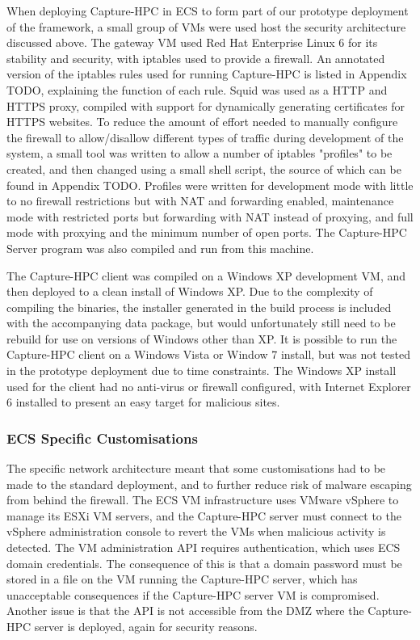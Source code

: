 When deploying Capture-HPC in ECS to form part of our prototype deployment of
the framework, a small group of VMs were used host the security architecture
discussed above. The gateway VM used Red Hat Enterprise Linux 6 for its
stability and security,
with iptables used to provide a firewall. An annotated version of the iptables
rules used for running Capture-HPC is listed in Appendix TODO, explaining the
function of each rule. Squid was used as a HTTP and HTTPS proxy, compiled with
support for dynamically generating certificates for HTTPS websites. To reduce
the amount of effort needed to manually configure the firewall to allow/disallow
different types of traffic during
development of the system, a small tool was written to allow a number of
iptables "profiles" to be created, and then changed using a small shell script,
the source of which can be found in Appendix TODO. Profiles were written for
development mode with little to no firewall restrictions but with NAT and
forwarding enabled, maintenance mode with restricted ports but forwarding with
NAT instead of proxying, and full mode with proxying and the minimum number of
open ports. The Capture-HPC Server program was also compiled and run from this machine.

The Capture-HPC client was compiled on a Windows XP development VM, and then
deployed to a clean install of Windows XP. Due to the complexity of compiling
the binaries, the installer generated in the build process is included with the
accompanying data package, but would unfortunately still need to be rebuild for
use on versions of Windows other than XP. It is possible to run the
Capture-HPC client on a Windows Vista or Window 7 install, but was not tested in
the prototype deployment due to time constraints. The Windows XP install used
for the client had no anti-virus or firewall configured, with Internet Explorer
6 installed to present an easy target for malicious sites.

\subsubsection{ECS Specific Customisations}

The specific network architecture meant that some customisations had to be made
to the standard deployment, and to further reduce risk of malware escaping from
behind the firewall. The ECS VM infrastructure uses VMware vSphere to manage its
ESXi VM servers, and the Capture-HPC server must connect to the vSphere
administration console to revert the VMs when malicious activity is detected.
The VM administration API requires authentication, which uses ECS domain
credentials. The consequence of this is that a domain password must be stored in
a file on the VM running the Capture-HPC server, which has unacceptable
consequences if the Capture-HPC server VM is compromised. Another issue is that
the API is not accessible from the DMZ where the Capture-HPC server is deployed,
again for security reasons.

